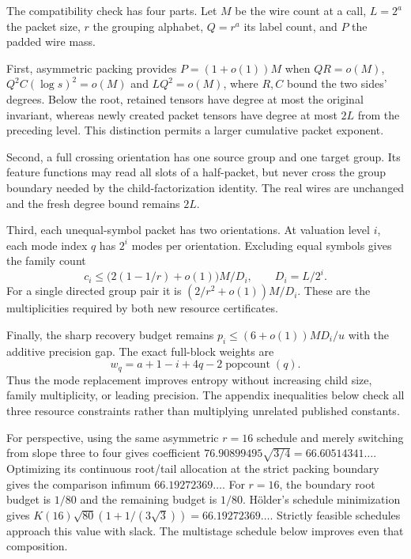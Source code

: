 \documentclass[11pt,letterpaper]{article}
\theoremstyle{definition}\newtheorem{definition}[theorem]{Definition}
\theoremstyle{remark}\newtheorem{remark}[theorem]{Remark}
\newcommand{\pop}{\operatorname{popcount}}
\begin{document}
The compatibility check has four parts. Let $M$ be the wire count at a
call, $L=2^a$ the packet size, $r$ the grouping alphabet, $Q=r^a$ its label
count, and $P$ the padded wire mass.

First, asymmetric packing provides $P=(1+o(1))M$ when
$QR=o(M)$, $Q^2C(\log s)^2=o(M)$ and $LQ^2=o(M)$, where $R,C$ bound
the two sides' degrees. Below the root, retained tensors have degree at
most the original invariant, whereas newly created packet tensors have
degree at most $2L$ from the preceding level. This distinction permits
a larger cumulative packet exponent.

Second, a full crossing orientation has one source group and one target
group. Its feature functions may read all slots of a half-packet, but
never cross the group boundary needed by the child-factorization identity.
The real wires are unchanged and the fresh degree bound remains $2L$.

Third, each unequal-symbol packet has two orientations. At valuation level
$i$, each mode index $q$ has $2^i$ modes per orientation. Excluding equal
symbols gives the family count
\[
 c_i\le\bigl(2(1-1/r)+o(1)\bigr)M/D_i,
 \qquad D_i=L/2^i.
\]
For a single directed group pair it is
$(2/r^2+o(1))M/D_i$. These are the multiplicities required by both new
resource certificates.

Finally, the sharp recovery budget remains
$p_i\le(6+o(1))MD_i/u$ with the additive precision gap. The exact
full-block weights are
\[
 w_q=a+1-i+4q-2\pop(q).
\]
Thus the mode replacement improves entropy without increasing child size,
family multiplicity, or leading precision. The appendix inequalities below
check all three resource constraints rather than multiplying unrelated
published constants.

For perspective, using the same asymmetric $r=16$ schedule and merely
switching from slope three to four gives coefficient
$76.90899495\sqrt{3/4}=66.60514341\ldots$.
Optimizing its continuous root/tail allocation at the strict packing
boundary gives the comparison infimum $66.19272369\ldots$.
For $r=16$, the boundary root budget is $1/80$ and the remaining
budget is $1/80$. H\"older's schedule minimization gives
$K(16)\sqrt{80}(1+1/(3\sqrt3))=66.19272369\ldots$.
Strictly feasible schedules approach this value with slack.
The multistage schedule below improves even that composition.




\end{document}
